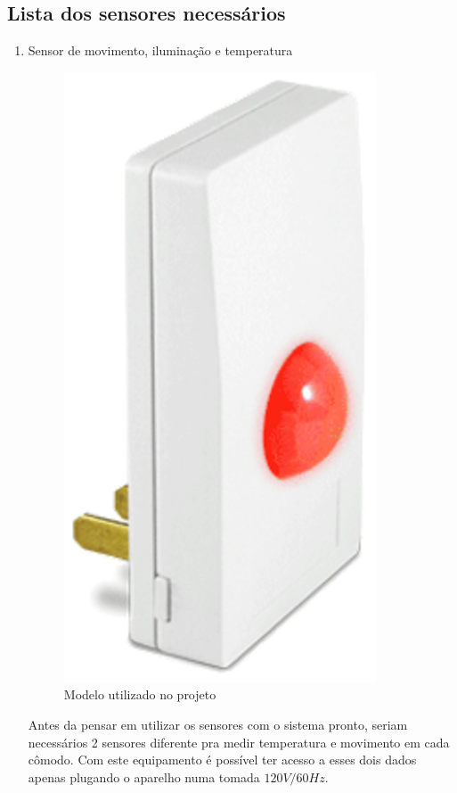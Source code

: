 \subsection{Lista dos sensores necessários}
\begin{enumerate}
	\item Sensor de movimento, iluminação e temperatura
	\begin{figure}[h]
	  \begin{center}
		\includegraphics{figuras/sensor_movimento.eps}
		\caption{Modelo utilizado no projeto}
	  \end{center}
	\end{figure}

	Antes da pensar em utilizar os sensores com o sistema pronto, seriam necessários 2 sensores diferente pra medir temperatura e movimento em cada cômodo. Com este equipamento é possível ter acesso a esses dois dados apenas plugando o aparelho numa tomada $120V/60Hz$.


\end{enumerate}
